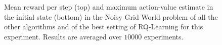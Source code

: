 \begin{figure}[t]
\begin{minipage}{\columnwidth}
\end{minipage}
  \caption[Noisy grid world algorithms comparison]{Mean reward per step (top) and maximum action-value estimate in the initial state (bottom) in the Noisy Grid World problem of all the other algorithms and of the best setting of RQ-Learning for this experiment. Results are averaged over $10000$ experiments.}
  \label{F:hasselt_all}
\end{figure}
\begin{figure}[t]
\begin{minipage}{\columnwidth}
\centering

\end{minipage}
\end{figure}
